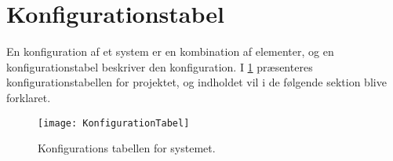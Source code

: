 \section{Konfigurationstabel}\label{konfigurationstabel}
En konfiguration af et system er en kombination af elementer, og en konfigurationstabel beskriver den konfiguration.
I \cref{tab:konfigurationsTabel} præsenteres konfigurationstabellen for projektet, og indholdet vil i de følgende sektion blive forklaret.

\begin{figure}
\texttt{[image: KonfigurationTabel]}
\caption{Konfigurations tabellen for systemet.}
\label{tab:konfigurationsTabel}
\end{figure}
